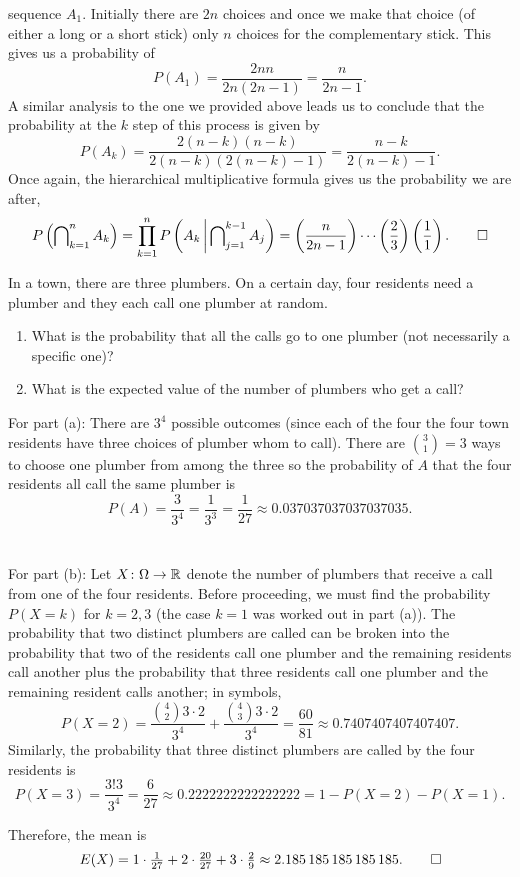 \begin{solution*}
  sequence \(A_1\). Initially there are \(2n\) choices and once we make
  that choice (of either a long or a short stick) only \(n\) choices for
  the complementary stick. This gives us a probability of
  \[
    P(A_1)=\frac{2nn}{2n(2n-1)}=\frac{n}{2n-1}.
  \]
  A similar analysis to the one we provided above leads us to conclude that
  the probability at the \(k\) step of this process is given by
  \[
    P(A_k)=\frac{2(n-k)(n-k)}{2(n-k)(2(n-k)-1)}=\frac{n-k}{2(n-k)-1}.
  \]
  Once again, the hierarchical multiplicative formula gives us the
  probability we are after,
  \[
    P\left(\bigcap\nolimits_{k=1}^n A_k\right)=%
    \prod_{k=1}^n
    P\left(A_k\,\middle|\,\bigcap\nolimits_{j=1}^{k-1}A_j\right)=%
    \left(\frac{n}{2n-1}\right)\dotsm
    \left(\frac{2}{3}\right)\left(\frac{1}{1}\right).\qedhere
  \]
\end{solution*}

\begin{problem}[Handout 3, \# 5]
  In a town, there are three plumbers. On a certain day, four residents
  need a plumber and they each call one plumber at random.
  \begin{enumerate}[label=(\alph*),noitemsep]
  \item What is the probability that all the calls go to one plumber (not
    necessarily a specific one)?
  \item What is the expected value of the number of plumbers who get a
    call?
  \end{enumerate}
\end{problem}
\begin{solution*}
  For part (a): There are \(3^4\) possible outcomes (since each of the four
  the four town residents have three choices of plumber whom to
  call). There are \(\binom{3}{1}=3\) ways to choose one plumber from among
  the three so the probability of \(A\) that the four residents all call
  the same plumber is
  \[
    P(A)=\frac{3}{3^4}=%
    \frac{1}{3^3}=%
    \frac{1}{27}\approx%
    \num{0.037037037037037035}.
  \]
  \\\\
  For part (b): Let \(X\colon\Omega\to\mathbb{R}\) denote the number of plumbers
  that receive a call from one of the four residents. Before proceeding, we
  must find the probability \(P(X=k)\) for \(k=2,3\) (the case \(k=1\) was
  worked out in part (a)). The probability that two distinct plumbers are
  called can be broken into the probability that two of the residents call
  one plumber and the remaining residents call another plus the probability
  that three residents call one plumber and the remaining resident calls
  another; in symbols,
  \[
    P(X=2)=%
    \frac{\binom{4}{2}3\cdot 2}{3^4}+\frac{\binom{4}{3}3\cdot 2}{3^4}=%
    \frac{60}{81}\approx\num{0.7407407407407407}.
  \]
  Similarly, the probability that three distinct plumbers are called by the
  four residents is
  \[
    P(X=3)=%
    \frac{3!3}{3^4}=\frac{6}{27}\approx%
    \num{0.2222222222222222}=%
    1-P(X=2)-P(X=1).
  \]

  Therefore, the mean is
  \[
    E(X)
    =1\cdot\tfrac{1}{27}+2\cdot\tfrac{20}{27}+3\cdot\tfrac{2}{9}
    \approx\num{2.185185185185185}.\qedhere
  \]
\end{solution*}

